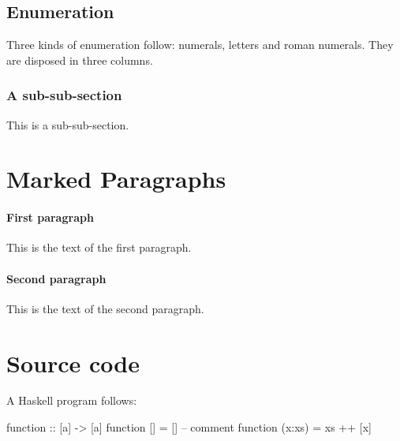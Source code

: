 \documentclass[12pt,a4paper]{article}
\begin{document}
\subsection{Enumeration}
\label{sec:enumeration}

Three kinds of enumeration follow: numerals, letters and roman numerals.
They are disposed in three columns.



\subsubsection{A sub-sub-section}

This is a sub-sub-section.


\section{Marked Paragraphs}
\label{sec:paragraphs}

\paragraph{First paragraph} This is the text of the first paragraph.

\paragraph{Second paragraph} This is the text of the second paragraph.


\section{Source code}
\label{sec:source}

A Haskell program follows:

\begin{haskell}
	function :: [a] -> [a]
	function [] = []            -- comment
	function (x:xs) = xs ++ [x]
\end{haskell}
\end{document}
